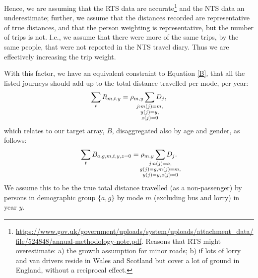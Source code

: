 \documentclass{article}
\begin{document}
Hence, we are assuming that the RTS data are accurate\footnote{\url{https://www.gov.uk/government/uploads/system/uploads/attachment_data/file/524848/annual-methodology-note.pdf}. Reasons that RTS might overestimate: a) the growth assumption for minor roads; b) if lots of lorry and van drivers reside in Wales and Scotland but cover a lot of ground in England, without a reciprocal effect.} and the NTS data an underestimate; further, we assume that the distances recorded are representative of true distances, and that the person weighting is representative, but the number of trips is not. I.e., we assume that there were more of the same trips, by the same people, that were not reported in the NTS travel diary. Thus we are effectively increasing the trip weight. %

With this factor, we have an equivalent constraint to Equation \ref{B}, that all the listed journeys should add up to the total distance travelled per mode, per year:
\begin{equation}\sum_{t}R_{m,t,y} = \rho_{m,y} \smashoperator{\sum_{\substack{j:m(j)=m,\\y(j)=y,\\z(j)=0}}}D_{j},\end{equation}
which relates to our target array, $B$, disaggregated also by age and gender, as follows:
\begin{equation}\sum_{t}B_{a,g,m,t,y,z=0} = \rho_{m,y} \smashoperator{\sum_{\substack{j:a(j)=a,\\g(j)=g,m(j)=m,\\y(j)=y,z(j)=0}}}D_{j}.\end{equation}
We assume this to be the true total distance travelled (as a non-passenger) by persons in demographic group $\{a,g\}$ by mode $m$ (excluding bus and lorry) in year $y$.

\end{document}

